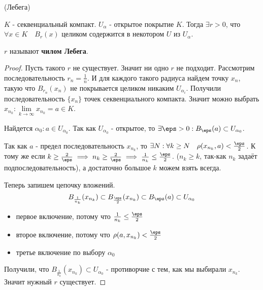
\begin{lemma}(Лебега) \thmslashn

$K$ - секвенциальный компакт. $U_{\alpha}$ - открытое покрытие $K$. Тогда $\exists r > 0$, что $\forall x \in K \quad B_r(x)$ целиком содержится в некотором $U$ из $U_{\alpha}$.
\par $r$ называют \textbf{чилом Лебега}.

  \begin{proof} \thmslashn
   
    Пусть такого $r$ не существует. Значит ни одно $r$ не подходит. Рассмотрим последовательность $r_n = \frac{1}{n}$. И для каждого такого радиуса найдем точку $x_n$, такую что
    $B_{r_n}(x_n)$ не покрывается целиком никаким $U_{\alpha_i}$. Получили последовательность $\{x_n\}$ точек секвенциального компакта. Значит можно выбрать $x_{n_k}: \lim\limits_{k\rightarrow\infty}{x_{n_k}} = a \in K$. \par
  Найдется $\alpha_0 : a \in U_{\alpha_0}$. Так как $U_{\alpha_0}$ - открытое, то $\exists \eps > 0: B_{\eps}(a) \subset U_{\alpha_0}$. \par
  Так как $a$ - предел последовательность $x_{n_k}$, то $\exists N : \forall k \ge N \quad  \rho(x_{n_k}, a) < \frac{\eps}{2}$. К тому же если $k \ge \frac{2}{\eps} \implies n_k \ge \frac{2}{\eps} \implies \frac{1}{n_k} \le \frac{\eps}{2}$. ($n_{k} \ge k$, так-как $n_{k}$ задаёт подпоследовательность), а достаточно большое $k$ можем взять всегда. \par
  Теперь запишем цепочку вложений. 
  \[
    B_{\frac{1}{n_k}}(x_{n_k}) \subset B_{\frac{\eps}{2}}(x_{n_k}) \subset B_{\eps}(a) \subset U_{\alpha_0} 
  \]
  \begin{itemize}
    \item первое включение, потому что $\frac{1}{n_k} \le \frac{\eps}{2}$
    \item второе включение, потому что $\rho(a, x_{n_k}) < \frac{\eps}{2}$
    \item третье включение по выбору $\alpha_0$
  \end{itemize}

  Получили, что $B_{\frac{1}{n_k}}(x_{n_k}) \subset U_{\alpha_0}$ - противорчие с тем, как мы выбирали $x_{n_k}$. Значит нужный $r$ существует.

  \end{proof}

\end{lemma}

